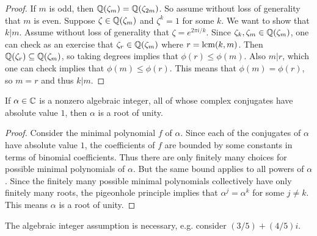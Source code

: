 \begin{proof}
  If $m$ is odd, then $\mathbb{Q}(\zeta_m) = \mathbb{Q}(\zeta_{2m})$.
  So assume without loss of generality that $m$ is even.
  Suppose $\zeta \in \mathbb{Q}(\zeta_m)$
  and $\zeta^k = 1$ for some $k$. We want to show
  that $k | m$. Assume without loss of generality that
  $\zeta = e^{2\pi i / k}$. Since
  $\zeta_k, \zeta_m \in \mathbb{Q}(\zeta_{m})$, one can check
  as an exercise that
  $\zeta_r \in \mathbb{Q}(\zeta_{m})$ where $r = \operatorname{lcm}(k, m)$. Then
  $\mathbb{Q}(\zeta_r) \subseteq \mathbb{Q}(\zeta_m)$, so taking
  degrees implies that $\phi(r) \le \phi(m)$. Also
  $m | r$, which one can check
  implies that $\phi(m) \le \phi(r)$.
  This means that $\phi(m) = \phi(r)$, so
  $m = r$ and thus $k | m$.
\end{proof}

\begin{lemma}
  If $\alpha \in \mathbb{C}$ is a nonzero algebraic integer,
  all of whose complex conjugates have absolute value
  $1$, then $\alpha$ is a root of unity.
\end{lemma}

\begin{proof}
  Consider the minimal polynomial $f$ of $\alpha$. Since
  each of the conjugates of $\alpha$ have absolute
  value $1$, the coefficients of $f$ are bounded by
  some constants in terms of binomial coefficients.
  Thus there are only finitely many choices for
  possible minimal polynomials of $\alpha$.
  But the same bound applies to all powers of $\alpha$.
  Since the finitely many possible minimal polynomials
  collectively have only finitely many roots,
  the pigeonhole principle implies that $\alpha^j = \alpha^k$
  for some $j \ne k$. This means $\alpha$ is
  a root of unity.
\end{proof}

\begin{remark}
  The algebraic integer assumption is necessary, e.g.
  consider $(3 / 5) + (4 / 5) i$.
\end{remark}
